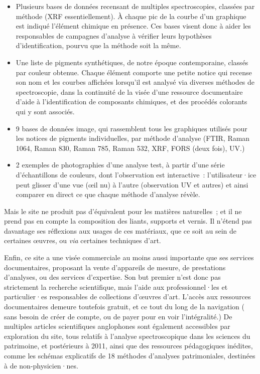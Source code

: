 \documentclass[a4paper,12pt, twoside]{book}
\begin{document}
 \begin{itemize}
     \item Plusieurs bases de données recensant de multiples spectroscopies, classées par méthode (XRF essentiellement). À chaque pic de la courbe d’un graphique est indiqué l’élément chimique en présence. Ces bases visent donc à aider les responsables de campagnes d’analyse à vérifier leurs hypothèses d’identification, pourvu que la méthode soit la même.\\

    \item Une liste de pigments synthétiques, de notre époque contemporaine, classés par couleur obtenue. Chaque élément comporte une petite notice qui recense son nom et les courbes affichées lorsqu’il est analysé via diverses méthodes de spectroscopie, dans la continuité de la visée d’une ressource documentaire d’aide à l’identification de composants chimiques, et des procédés colorants qui y sont associés.\\

    \item 9 bases de données image, qui rassemblent tous les graphiques utilisés pour les notices de pigments individuelles, par méthode d’analyse (FTIR, Raman 1064, Raman 830, Raman 785, Raman 532, XRF, FORS (deux fois), UV.)\\

    \item 2 exemples de photographies d’une analyse test, à partir d’une série d’échantillons de couleurs, dont l’observation est interactive~: l’utilisateur·ice peut glisser d’une vue (œil nu) à l’autre (observation UV et autres) et ainsi comparer en direct ce que chaque méthode d’analyse révèle.
 \end{itemize}

 Mais le site ne produit pas d’équivalent pour les matières naturelles~; et il ne prend pas en compte la composition des liants, supports et vernis. Il n’étend pas davantage ses réflexions aux usages de ces matériaux, que ce soit au sein de certaines œuvres, ou \textit{via} certaines techniques d’art.

 Enfin, ce site a une visée commerciale au moins aussi importante que ses services documentaires, proposant la vente d’appareils de mesure, de prestations d’analyses, ou des services d’expertise. Son but premier n’est donc pas strictement la recherche scientifique, mais l’aide aux professionnel·les et particulier·es responsables de collections d’œuvres d’art. L’accès aux ressources documentaires demeure toutefois gratuit, et ce tout du long de la navigation ( sans besoin de créer de compte, ou de payer pour en voir l’intégralité.) De multiples articles scientifiques anglophones sont également accessibles par exploration du site,  tous relatifs à l’analyse spectroscopique dans les sciences du patrimoine, et postérieurs à 2011, ainsi que des ressources pédagogiques inédites, comme les schémas explicatifs de 18 méthodes d’analyses patrimoniales, destinées à de non-physicien·nes.
\end{document}
